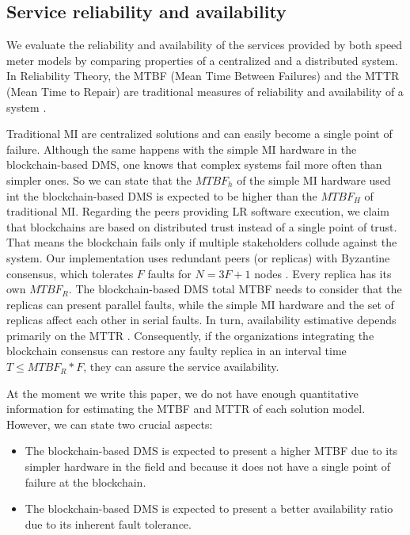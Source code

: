 \documentclass[journal]{IEEEtran}
\begin{document}
\subsection{Service reliability and availability}
We evaluate the reliability and availability of the services provided by both speed meter models by comparing properties of a centralized and a distributed system.
In Reliability Theory, the MTBF (Mean Time Between Failures) and the MTTR (Mean Time to Repair) are traditional measures of reliability and availability of a system \cite{koren2010fault}.

Traditional MI are centralized solutions and can easily become a single point of failure.
Although the same happens with the simple MI hardware in the blockchain-based DMS, one knows that complex systems fail more often than simpler ones.
So we can state that the $MTBF_h$ of the simple MI hardware used int the blockchain-based DMS is expected to be higher than the $MTBF_H$ of traditional MI.
Regarding the peers providing LR software execution, we claim that blockchains are based on distributed trust instead of a single point of trust.
That means the blockchain fails only if multiple stakeholders collude against the system.
Our implementation uses redundant peers (or replicas) with Byzantine consensus, which tolerates $F$ faults for $N = 3F + 1$ nodes \cite{Sousa2018}.
Every replica has its own $MTBF_R$.
The blockchain-based DMS total MTBF needs to consider that the replicas can present parallel faults, while the simple MI hardware and the set of replicas affect each other in serial faults.
In turn, availability estimative depends primarily on the MTTR \cite{koren2010fault}.
Consequently, if the organizations integrating the blockchain consensus can restore any faulty replica in an interval time  $T \leq MTBF_R *  F$, they can assure the service availability.

At the moment we write this paper, we do not have enough quantitative information for estimating the MTBF and MTTR of each solution model.
However, we can state two crucial aspects:
\begin{itemize}
 \item The blockchain-based DMS is expected to present a higher MTBF due to its simpler hardware in the field and because it does not have a single point of failure at the blockchain.
 \item The blockchain-based DMS is expected to present a better availability ratio due to its inherent fault tolerance.
\end{itemize}
\end{document}
